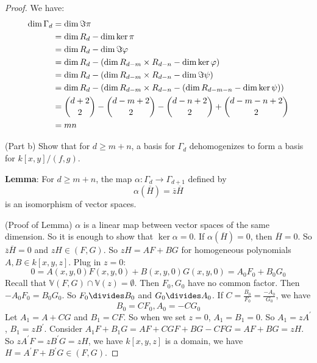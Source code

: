 \documentclass{report}
\begin{document}
\begin{proof}
    We have:
        \begin{align*}
            \dim \Gamma_{ d} &= \dim \Im{ \pi} \\
                             &= \dim R_{ d} - \dim \ker{ \pi} \\
                             &= \dim R_{ d} - \dim \Im{ \varphi} \\
                             &= \dim R_{ d} - (\dim R_{ d - m} \times R_{ d - n} - \dim \ker{ \varphi}) \\
                             &= \dim R_{ d} - (\dim R_{ d - m} \times R_{ d - n} - \dim \Im{ \psi}) \\
                             &= \dim R_{ d} - (\dim R_{ d - m} \times R_{ d - n} - (\dim R_{ d - m - n} - \dim \ker{ \psi})) \\
                             &= \dbinom{d + 2}{2} - \dbinom{d - m + 2}{2} - \dbinom{d - n + 2}{2} + \dbinom{d - m - n + 2}{2} \\
                             &= mn
        \end{align*}

    (Part b) Show that for $d \geq m + n$, a basis for $\Gamma_{ d}$ dehomogenizes to form a basis for $k[x, y] /(f, g)$. 

    \textbf{Lemma}: For $d \geq m + n$, the map $\alpha : \Gamma_{ d} \rightarrow \Gamma_{ d + 1}$ defined by 
        \begin{equation*}
            \alpha (\overline{H}) = \overline{z}\overline{H} 
        \end{equation*}
    is an isomorphism of vector spaces. 

    (Proof of Lemma) $\alpha$ is a linear map between vector spaces of the same dimension. So it is enough to show that $\ker{\alpha} = 0$. If $\alpha ( \overline{H}) = 0$, then $\overline{H} = 0$. So $\overline{z}\overline{H} = 0$ and $zH \in ( F, G)$. So $zH = AF + BG$ for homogeneous polynomials $A, B \in k[ x, y, z]$. Plug in $z = 0$:
        \begin{equation*}
            0 = A(x, y, 0)F(x, y, 0) + B(x, y, 0) G(x, y, 0) = A_{0}F_{0} + B_{0}G_{0}
        \end{equation*}
    Recall that $\mathbb{V}(F, G) \cap \mathbb{ V}(z) = \emptyset$. Then $F_{0}, G_{0}$ have no common factor. Then $-A_{0}F_{0} = B_{0}G_{0}$. So $F_{0} \divides B_{ 0}$ and $G_{0} \divides A_{ 0}$. If $C = \frac{B_{0}}{F_{0}} = \frac{-A_{0}}{G_{0}}$, we have
        \begin{equation*}
            B_{0} = CF_{0}, A_{0} = -CG_{0}
        \end{equation*}
    Let $A_{1} = A + CG$ and $B_{1} = CF$. So when we set $z = 0$, $A_{1} = B_{1} = 0$. So $A_{1} = zA^{\prime}$, $B_{1} = zB^{\prime}$. Consider $A_{1}F + B_{1}G = AF + CGF + BG - CFG = AF + BG = zH$. So $zA^{\prime}F = zB^{\prime}G = zH$, we have $k[x, y, z]$ is a domain, we have $H = A^{\prime}F + B^{\prime}G \in (F, G)$.


\end{proof}
\end{document}
